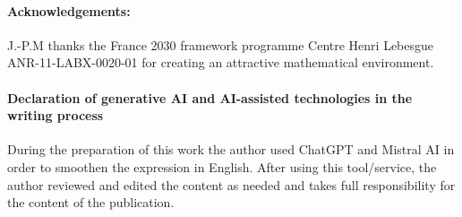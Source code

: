 \documentclass{amsart}
\newcounter{ex}
\newcounter{re}
\begin{document}
\vskip 12pt

\paragraph{\bf Acknowledgements:} J.-P.M  thanks the France 2030 framework programme Centre Henri Lebesgue ANR-11-LABX-0020-01 
for creating an attractive mathematical environment.

\vskip 12pt

\paragraph{\bf Declaration of generative AI and AI-assisted technologies in the writing process}

During the preparation of this work the author used ChatGPT and Mistral AI in order to smoothen the expression in English. After using this tool/service, the author reviewed and edited the content as needed and takes full responsibility for the content of the publication.

\vskip 12pt
\end{document}
